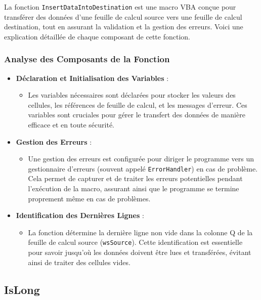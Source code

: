 \documentclass[a4paper, oneside, 12pt, final]{extreport}
\begin{document}
La fonction \texttt{InsertDataIntoDestination} est une macro VBA conçue pour transférer des données d'une feuille de calcul source vers une feuille de calcul destination, tout en assurant la validation et la gestion des erreurs. Voici une explication détaillée de chaque composant de cette fonction.

\subsubsection{Analyse des Composants de la Fonction}

\begin{itemize}
    \item \textbf{Déclaration et Initialisation des Variables} : 
    \begin{itemize}
        \item Les variables nécessaires sont déclarées pour stocker les valeurs des cellules, les références de feuille de calcul, et les messages d'erreur. Ces variables sont cruciales pour gérer le transfert des données de manière efficace et en toute sécurité.
    \end{itemize}

    \item \textbf{Gestion des Erreurs} : 
    \begin{itemize}
        \item Une gestion des erreurs est configurée pour diriger le programme vers un gestionnaire d'erreurs (souvent appelé \texttt{ErrorHandler}) en cas de problème. Cela permet de capturer et de traiter les erreurs potentielles pendant l'exécution de la macro, assurant ainsi que le programme se termine proprement même en cas de problèmes.
    \end{itemize}

    \item \textbf{Identification des Dernières Lignes} : 
    \begin{itemize}
        \item La fonction détermine la dernière ligne non vide dans la colonne Q de la feuille de calcul source (\texttt{wsSource}). Cette identification est essentielle pour savoir jusqu'où les données doivent être lues et transférées, évitant ainsi de traiter des cellules vides.
    \end{itemize}
\end{itemize}
\subsection{IsLong}
\end{document}
